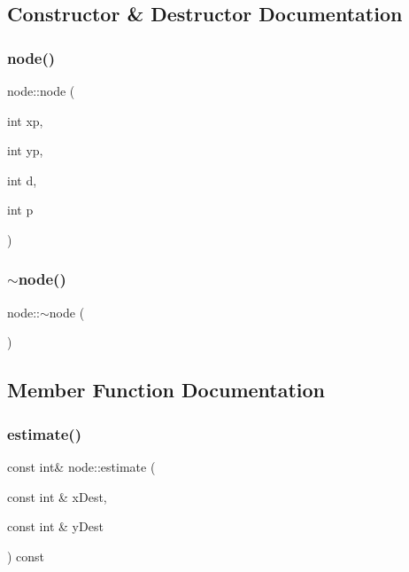 \subsection{Constructor \& Destructor Documentation}
\mbox{\label{classnode_a802701cab6639590de6f16136184c2de}} 
\subsubsection{\texorpdfstring{node()}{node()}}
{\footnotesize\ttfamily node\+::node (\begin{DoxyParamCaption}\item[{int}]{xp,  }\item[{int}]{yp,  }\item[{int}]{d,  }\item[{int}]{p }\end{DoxyParamCaption})\hspace{0.3cm}{\ttfamily [inline]}}

\mbox{\label{classnode_a482f83436a89f09d289b26144d817adf}} 
\subsubsection{\texorpdfstring{$\sim$node()}{~node()}}
{\footnotesize\ttfamily node\+::$\sim$node (\begin{DoxyParamCaption}{ }\end{DoxyParamCaption})\hspace{0.3cm}{\ttfamily [inline]}}



\subsection{Member Function Documentation}
\mbox{\label{classnode_acd0a1c2330a9984fa120fe7a6f169680}} 
\subsubsection{\texorpdfstring{estimate()}{estimate()}}
{\footnotesize\ttfamily const int\& node\+::estimate (\begin{DoxyParamCaption}\item[{const int \&}]{x\+Dest,  }\item[{const int \&}]{y\+Dest }\end{DoxyParamCaption}) const\hspace{0.3cm}{\ttfamily [inline]}}

